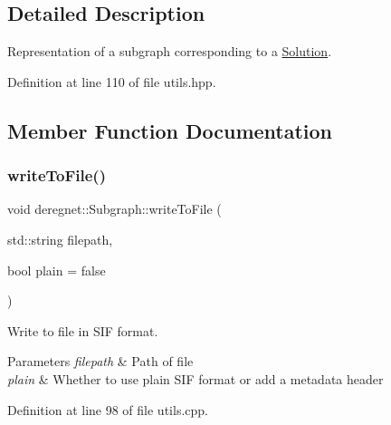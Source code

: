 \subsection{Detailed Description}
Representation of a subgraph corresponding to a \hyperlink{structderegnet_1_1Solution}{Solution}. 

Definition at line 110 of file utils.\+hpp.



\subsection{Member Function Documentation}
\mbox{\label{structderegnet_1_1Subgraph_ad82c2a1c9c43701b0239f3c32e120d82}} 
\subsubsection{\texorpdfstring{write\+To\+File()}{writeToFile()}}
{\footnotesize\ttfamily void deregnet\+::\+Subgraph\+::write\+To\+File (\begin{DoxyParamCaption}\item[{std\+::string}]{filepath,  }\item[{bool}]{plain = {\ttfamily false} }\end{DoxyParamCaption})}



Write to file in S\+IF format. 


\begin{DoxyParams}{Parameters}
{\em filepath} & Path of file \\
\hline
{\em plain} & Whether to use plain S\+IF format or add a metadata header \\
\hline
\end{DoxyParams}


Definition at line 98 of file utils.\+cpp.


